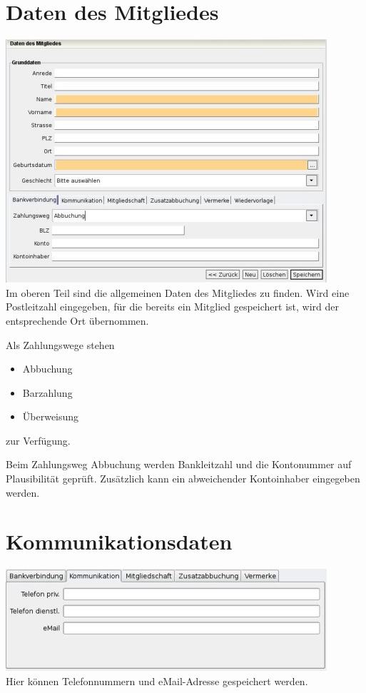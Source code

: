 \documentclass[a4paper,BCOR30mm,DIV14,pdftex,liststotoc,footsepline,openany]{scrbook}
\begin{document}
\section{Daten des Mitgliedes}
\includegraphics{./screenshots/mitglied.jpg}\\
Im oberen Teil sind die allgemeinen Daten des Mitgliedes zu finden. Wird eine Postleitzahl eingegeben, für die 
bereits ein Mitglied gespeichert ist, wird der entsprechende Ort übernommen. 

Als Zahlungswege stehen
\begin{itemize}
 \item Abbuchung
 \item Barzahlung
 \item Überweisung
\end{itemize}
zur Verfügung.


Beim Zahlungsweg Abbuchung werden Bankleitzahl und die Kontonummer auf Plausibilität geprüft. Zusätzlich kann ein
abweichender Kontoinhaber eingegeben werden.

\section{Kommunikationsdaten}
\includegraphics{./screenshots/mitgliedkommunikation.jpg}\\
Hier können Telefonnummern und eMail-Adresse gespeichert werden.
\end{document}
